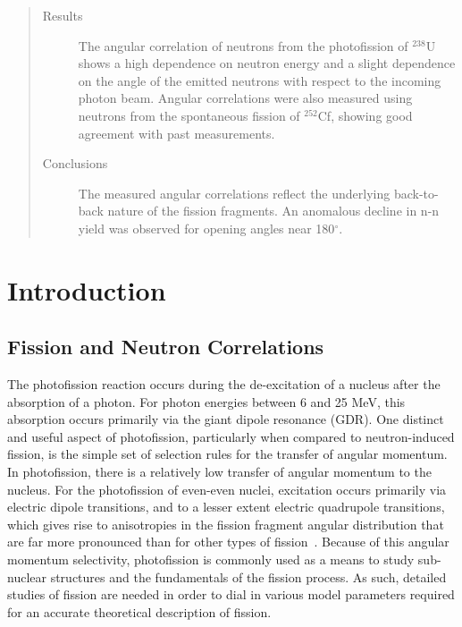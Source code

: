 \documentclass[%
 reprint,
 amsmath,amssymb,
 aps,
 nofootinbib
]{revtex4-1}
\begin{document}
\begin{abstract}
\begin{description}
        \item[Results] The angular correlation of neutrons from the photofission of $^{238}$U shows a high dependence on neutron energy and a slight dependence on the angle of the emitted neutrons with respect to the incoming photon beam.
        Angular correlations were also measured using neutrons from the spontaneous fission of $^{252}$Cf, showing good agreement with past measurements.
        \item[Conclusions] The measured angular correlations reflect the underlying back-to-back nature of the fission fragments.
        An anomalous decline in n-n yield was observed for opening angles near 180$^{\circ}$.
    \end{description}
\end{abstract}

\maketitle

\tableofcontents

\section{\label{sec:level1}Introduction}

\subsection{Fission and Neutron Correlations}
The photofission reaction occurs during the de-excitation of a nucleus after the absorption of a photon.
For photon energies between 6 and 25 MeV, this absorption occurs primarily via the giant dipole resonance (GDR).
One distinct and useful aspect of photofission, particularly when compared to neutron-induced fission, is the simple set of selection rules for the transfer of angular momentum.
In photofission, there is a relatively low transfer of angular momentum to the nucleus.
For the photofission of even-even nuclei, excitation occurs primarily via electric dipole transitions, and to a lesser extent electric quadrupole transitions, which gives rise to anisotropies in the fission fragment angular distribution that are far more pronounced than for other types of fission~\cite{1977FragAss}.
Because of this angular momentum selectivity, photofission is commonly used as a means to study sub-nuclear structures and the fundamentals of the fission process.
As such, detailed studies of fission are needed in order to dial in various model parameters required for an accurate theoretical description of fission.
\end{document}
